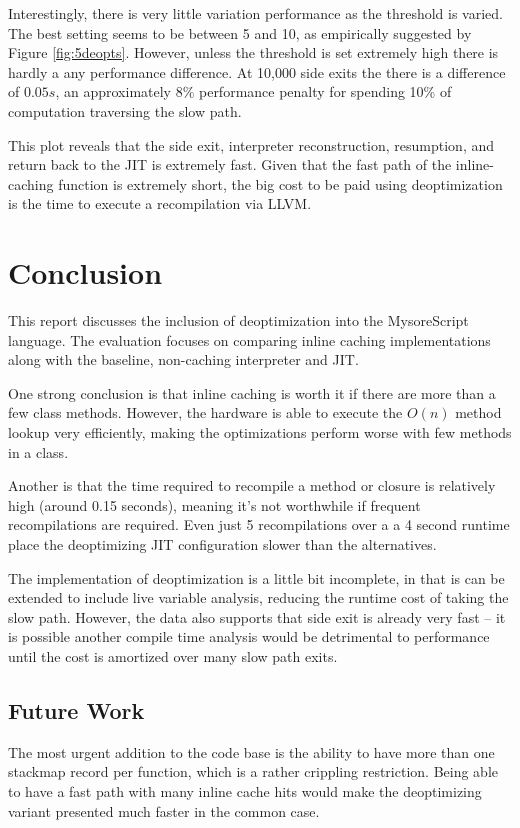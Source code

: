 \documentclass[journal,comsoc]{IEEEtran}
\begin{document}
	
	Interestingly, there is very little variation performance as the threshold is varied. The best setting seems to be between 5 and 10, as empirically suggested by Figure \ref{fig:5deopts}. However, unless the threshold is set extremely high there is hardly a any performance difference. At 10,000 side exits the there is a difference of $0.05s$, an approximately $8\%$ performance penalty for spending 10\% of computation traversing the slow path.
	
	This plot reveals that the side exit, interpreter reconstruction, resumption, and return back to the JIT is extremely fast. Given that the fast path of the inline-caching function is extremely short, the big cost to be paid using deoptimization is the time to execute a recompilation via LLVM.


	
\section{Conclusion} 
This report discusses the inclusion of deoptimization into the MysoreScript language. The evaluation focuses on comparing inline caching implementations along with the baseline, non-caching interpreter and JIT.

One strong conclusion is that inline caching is worth it if there are more than a few class methods. However, the hardware is able to execute the $O(n)$ method lookup very efficiently, making the optimizations perform worse with few methods in a class. 

Another is that the time required to recompile a method or closure is relatively high (around 0.15 seconds), meaning it's not worthwhile if frequent recompilations are required. Even just 5 recompilations over a a 4 second runtime place the deoptimizing JIT configuration slower than the alternatives.

The implementation of deoptimization is a little bit incomplete, in that is can be extended to include live variable analysis, reducing the runtime cost of taking the slow path. However, the data also supports that side exit is already very fast -- it is possible another compile time analysis would be detrimental to performance until the cost is amortized over many slow path exits.

\subsection{Future Work}
The most urgent addition to the code base is the ability to have more than one stackmap record per function, which is a rather crippling restriction. Being able to have a fast path with many inline cache hits would make the deoptimizing variant presented much faster in the common case.
\end{document}
